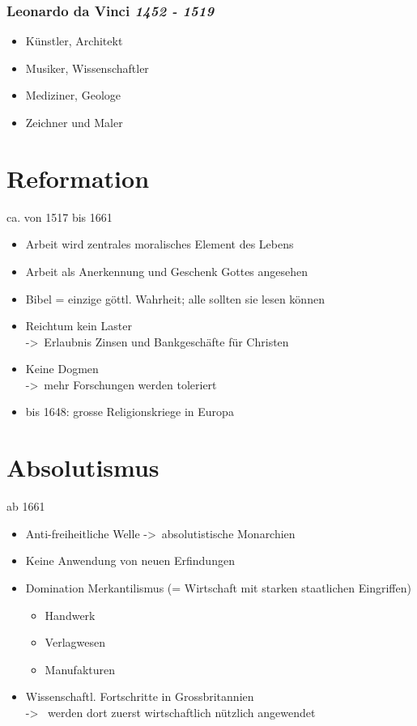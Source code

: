 \documentclass{report}
\begin{document}
\subsubsection{Leonardo da Vinci \rm{\textit{1452 - 1519}}}
\begin{itemize}
	\item Künstler, Architekt
	\item Musiker, Wissenschaftler
	\item Mediziner, Geologe
	\item Zeichner und Maler
\end{itemize}

\newpage

\section{Reformation}
ca. von 1517 bis 1661\\
\begin{itemize}
	\item Arbeit wird zentrales moralisches Element des Lebens
	\item Arbeit als Anerkennung und Geschenk Gottes angesehen
	\item Bibel = einzige göttl. Wahrheit; alle sollten sie lesen können
	\item Reichtum kein Laster\\
	-\textgreater~Erlaubnis Zinsen und Bankgeschäfte für Christen
	\item Keine Dogmen\\
	-\textgreater~mehr Forschungen werden toleriert
	\item bis 1648: grosse Religionskriege in Europa
\end{itemize}

\section{Absolutismus}
ab 1661
\begin{itemize}
	\item Anti-freiheitliche Welle -\textgreater~absolutistische Monarchien
	\item Keine Anwendung von neuen Erfindungen
	\item Domination Merkantilismus (= Wirtschaft mit starken staatlichen Eingriffen)
		\begin{itemize}
			\item Handwerk
			\item Verlagwesen
			\item Manufakturen
		\end{itemize}
	\item Wissenschaftl. Fortschritte in Grossbritannien\\
	-\textgreater~ werden dort zuerst wirtschaftlich nützlich angewendet
\end{itemize}
\end{document}
